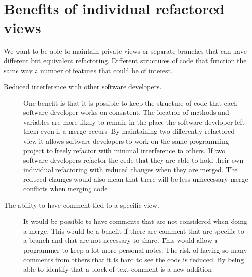 
\section{Benefits of individual refactored views}
We want to be able to maintain private views or separate branches that can have different but equivalent refactoring. Different structures of code that function the same way a number of features that could be of interest.

\begin{description}

  \item [Reduced interference with other software developers.]   
  One benefit is that it is possible to keep the structure of code that each software developer works on consistent.  The location of methods and variables are more likely to remain in the place the software developer left them even if a merge occurs.
  By maintaining two differently refactored view it allows software developers to work on the same programming project to freely refactor with minimal interference to others.
  If two software developers refactor the code that they are able to hold their own individual refactoring with reduced changes when they are merged.
  The reduced changes would also mean that there will be less unnecessary merge conflicts when merging code.
  
  \item [The ability to have comment tied to a specific view.] 
  It would be possible to have comments that are not considered when doing a merge. This would be a benefit if there are comment that are specific to a branch and that are not necessary to share.  This would allow a programmer to keep a lot more personal notes.  The risk of having so many comments from others that it is hard to see the code is reduced. By being able to identify that a block of text comment is a new addition

\end{description}


